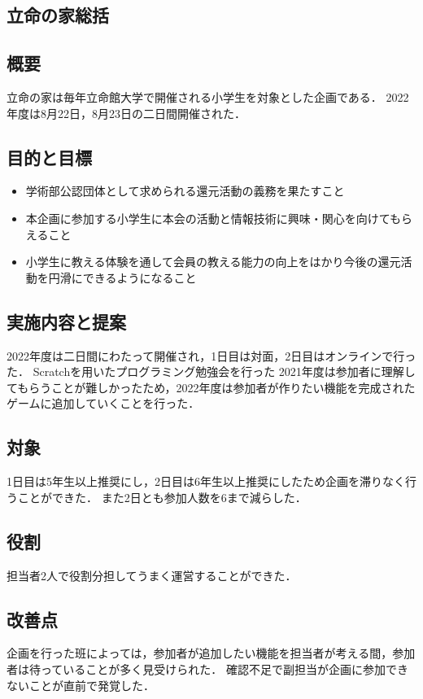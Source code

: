 \subsection*{立命の家総括}


\subsection*{概要}
立命の家は毎年立命館大学で開催される小学生を対象とした企画である．
2022年度は8月22日，8月23日の二日間開催された．

\subsection*{目的と目標}
\begin{itemize}
    \item 学術部公認団体として求められる還元活動の義務を果たすこと
    \item 本企画に参加する小学生に本会の活動と情報技術に興味・関心を向けてもらえること
    \item 小学生に教える体験を通して会員の教える能力の向上をはかり今後の還元活動を円滑にできるようになること
\end{itemize}
\subsection*{実施内容と提案}
2022年度は二日間にわたって開催され，1日目は対面，2日目はオンラインで行った．
Scratchを用いたプログラミング勉強会を行った
2021年度は参加者に理解してもらうことが難しかったため，2022年度は参加者が作りたい機能を完成されたゲームに追加していくことを行った．

\subsection*{対象}
1日目は5年生以上推奨にし，2日目は6年生以上推奨にしたため企画を滞りなく行うことができた．
また2日とも参加人数を6まで減らした．

\subsection*{役割}
担当者2人で役割分担してうまく運営することができた．

\subsection*{改善点}
企画を行った班によっては，参加者が追加したい機能を担当者が考える間，参加者は待っていることが多く見受けられた．
確認不足で副担当が企画に参加できないことが直前で発覚した．
